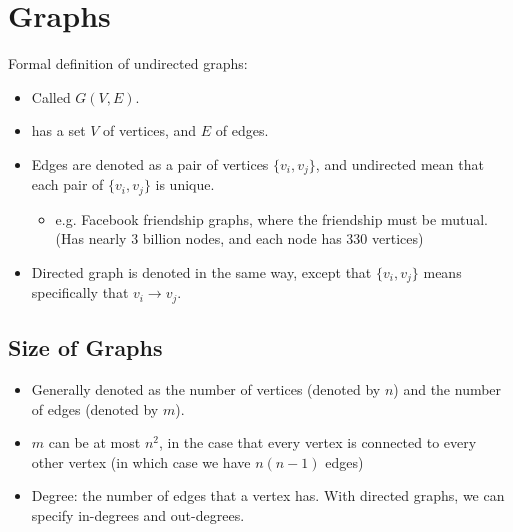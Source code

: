 \section{Graphs}
	Formal definition of undirected graphs:
	\begin{itemize}
		\item Called $G(V, E)$.
		\item has a set $V$ of vertices, and $E$ of edges.
		\item Edges are denoted as a pair of vertices $\{v_i, v_j\}$, and undirected mean that each 
			pair of $\{v_i, v_j\}$ is unique.
			\begin{itemize}
				\item e.g. Facebook friendship graphs, where the friendship must be mutual. (Has nearly 3 billion
					nodes, and each node has 330 vertices)
			\end{itemize}
		\item Directed graph is denoted in the same way, except that $\{v_i, v_j\}$ means 
			specifically that $v_i \to v_j$.
	\end{itemize}

	\subsection{Size of Graphs}
	\begin{itemize}
		\item Generally denoted as the number of vertices (denoted by $n$) and the number of edges 
			(denoted by $m$).
		\item $m$ can be at most $n^2$, in the case that every vertex is connected to every other vertex 
			(in which case we have $n(n-1)$ edges)
		\item Degree: the number of edges that a vertex has. With directed graphs, we can specify in-degrees
			and out-degrees.
	\end{itemize}

